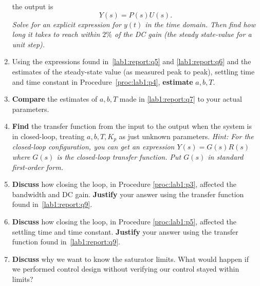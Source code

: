 \begin{deliverable}[label={lab1:report}]
\begin{enumerate}[label={(\arabic*)}]
{{      the output is}
      \[
        Y(s) = P(s) U(s).
      \]
      \emph{Solve for an explicit expression for \(y(t)\) in the time domain.
      Then find how long it takes to reach within \(2\%\) of the DC gain (the steady state-value for a unit step).}
    }
    \item{
      \label{lab1:report:q7}
      Using the expressions found in~\ref{lab1:report:q5} and
      \ref{lab1:report:q6} and the estimates of the steady-state value (as measured peak to peak), settling time and time constant in Procedure~\ref{proc:lab1:p4},
      \textbf{estimate} \(a, b, T.\)
    }
    \item{
      \label{lab1:report:q8}
      \textbf{Compare} the estimates of \(a, b, T\) made in
      \ref{lab1:report:q7} to your actual parameters.
    }
    \item{
      \label{lab1:report:q9}
      \textbf{Find} the transfer
      function from the input to the output when the system is in
      closed-loop, treating \(a, b, T, K_p\) as just unknown parameters.
      \emph{Hint: For the closed-loop configuration, you can get an expression \(Y(s) = G(s) R(s)\) where
      \(G(s)\) is the closed-loop transfer function. Put \(G(s)\) in standard first-order form.}
    }
    \item{
      \label{lab1:report:q10}
      \textbf{Discuss} how closing the loop, in Procedure
      \ref{proc:lab1:p3}, affected the bandwidth and DC gain.
      \textbf{Justify} your answer using the transfer function
      found in~\ref{lab1:report:q9}.
    }
    \item{
      \label{lab1:report:q11}
      \textbf{Discuss} how closing the loop, in Procedure
      \ref{proc:lab1:p5}, affected the settling time and time constant.
      \textbf{Justify} your answer using the transfer function
      found in~\ref{lab1:report:q9}.
    }
    \item{
      \label{lab1:report:q12}
      \textbf{Discuss} why we want to know the saturator limits. What would
      happen if we performed control design without verifying our control
      stayed within limits?
    }
  \end{enumerate}
\end{deliverable}

